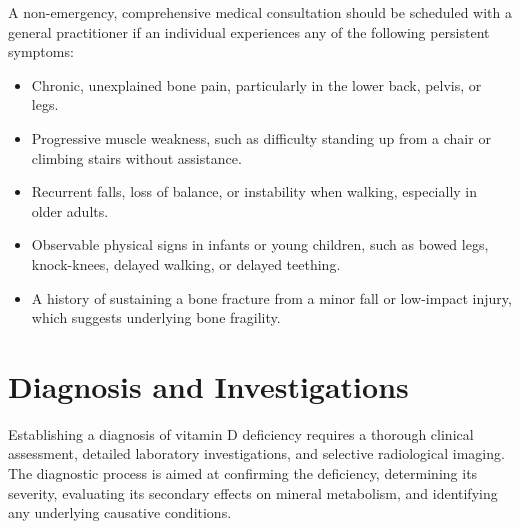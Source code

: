 A non-emergency, comprehensive medical consultation should be scheduled with a general practitioner if an individual experiences any of the following persistent symptoms:
\begin{itemize}
    \item Chronic, unexplained bone pain, particularly in the lower back, pelvis, or legs.
    \item Progressive muscle weakness, such as difficulty standing up from a chair or climbing stairs without assistance.
    \item Recurrent falls, loss of balance, or instability when walking, especially in older adults.
    \item Observable physical signs in infants or young children, such as bowed legs, knock-knees, delayed walking, or delayed teething.
    \item A history of sustaining a bone fracture from a minor fall or low-impact injury, which suggests underlying bone fragility.
\end{itemize}

\section*{Diagnosis and Investigations}
Establishing a diagnosis of vitamin D deficiency requires a thorough clinical assessment, detailed laboratory investigations, and selective radiological imaging. The diagnostic process is aimed at confirming the deficiency, determining its severity, evaluating its secondary effects on mineral metabolism, and identifying any underlying causative conditions.

